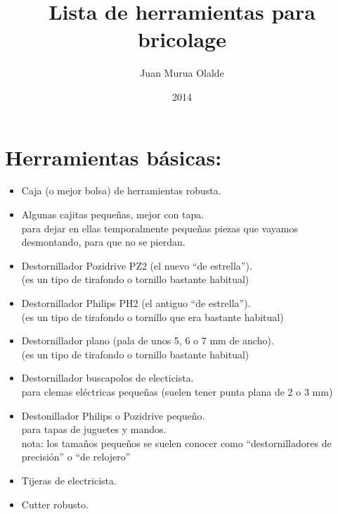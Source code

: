 \documentclass[spanish,10pt,a4paper,final,oneside]{article}
\title{Lista de herramientas para bricolage}
\author{Juan Murua Olalde}
\date{2014}
\begin{document}
\begin{center}\begin{LARGE}
\MyTitle
\end{LARGE}\end{center}
\begin{footnotesize}
\end{footnotesize}


\section*{Herramientas básicas:}
\begin{itemize}

\item Caja (o mejor bolsa) de herramientas robusta.

\item Algunas cajitas pequeñas, mejor con tapa.
\\para dejar en ellas temporalmente pequeñas piezas que vayamos desmontando, para que no se pierdan.

\item Destornillador Pozidrive PZ2 (el nuevo ``de estrella'').
\\(es un tipo de tirafondo o tornillo bastante habitual)

\item Destornillador Philips PH2 (el antiguo ``de estrella'').
\\(es un tipo de tirafondo o tornillo que era bastante habitual)

\item Destornillador plano (pala de unos 5, 6 o 7 mm de ancho).
\\(es un tipo de tirafondo o tornillo bastante habitual)

\item Destornillador buscapolos de electicista.
\\para clemas eléctricas pequeñas (suelen tener punta plana de 2 o 3 mm)

\item Destonillador Philips o Pozidrive pequeño.
\\para tapas de juguetes y mandos.
\\nota: los tamaños pequeños se suelen conocer como ``destornilladores de precisión'' o ``de relojero''

\item Tijeras de electricista.

\item Cutter robusto.


\end{itemize}
\end{document}
